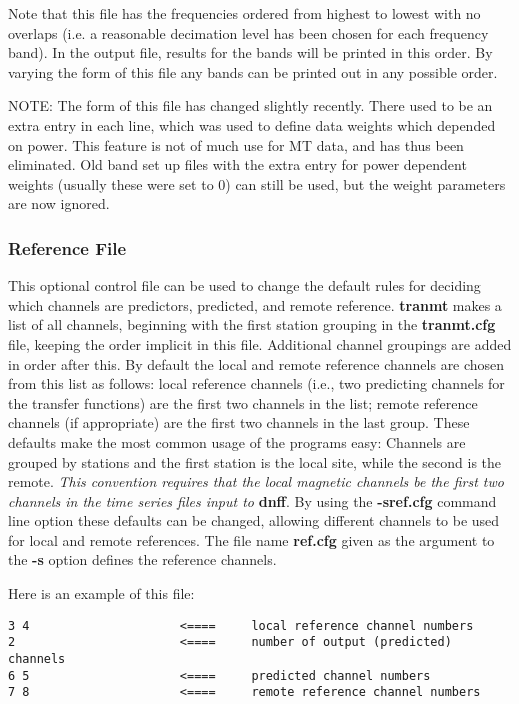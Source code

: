 Note that this file has the frequencies ordered from highest to lowest
with no overlaps (i.e. a reasonable decimation level has been chosen for
each frequency band).
In the output file,
results for the bands will be printed in this order.
By varying the form of this file any bands 
can be printed out in any possible order.

NOTE: The form of this file has changed slightly recently.
There used to be an extra entry in each line,
which was used to define data weights which depended on power.
This feature is not of much use for MT data, and has thus
been eliminated.  Old band set up files with the extra entry
for power dependent weights (usually these were set to 0)
can still be used, but the weight parameters are now ignored.

\subsubsection{Reference File}

This optional control file can be used to change the default rules for
deciding which channels are predictors, predicted, and remote reference.
{\bf tranmt} makes a list of all channels, 
beginning with the first station
grouping in the {\bf tranmt.cfg} file, keeping the order implicit in
this file.  Additional channel groupings are added in order after this.
By default 
the local and remote reference channels are chosen from this list
as follows: local reference channels (i.e., two predicting channels for
the transfer functions) are the first two channels in the list;
remote reference channels (if appropriate) are the first two channels in
the last group.  These defaults make the most common usage of the programs
easy: Channels are grouped by stations and the first station is the
local site, while the second is the remote.  
{\it This convention requires that
the local magnetic channels be the 
first two channels in the time series files
input to} {\bf dnff}.  By using the {\bf -sref.cfg}
command line option these defaults can be changed,
allowing different channels to be
used for local and remote references.  
The file name {\bf ref.cfg} given as the argument to the {\bf -s}
option defines the reference channels. 

Here is an example of this file:
\begin{verbatim}
3 4                     <====     local reference channel numbers
2                       <====     number of output (predicted) channels
6 5                     <====     predicted channel numbers
7 8                     <====     remote reference channel numbers
\end{verbatim}


